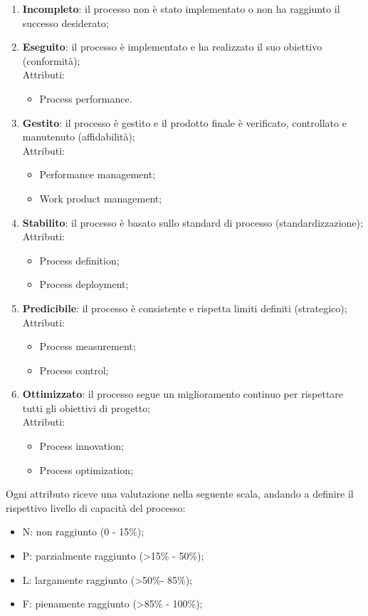 \begin{enumerate}
	\item \textbf{Incompleto}: il processo non è stato implementato o non ha raggiunto il successo desiderato;
	\item \textbf{Eseguito}: il processo è implementato e ha realizzato il suo obiettivo (conformità);\\
	Attributi:
	\begin{itemize}
		\item Process performance.
	\end{itemize}
	\item \textbf{Gestito}: il processo è gestito e il prodotto finale è verificato, controllato e manutenuto (affidabilità);\\
	Attributi:
	\begin{itemize}
		\item  Performance management;
		\item  Work product management;
	\end{itemize}
	\item \textbf{Stabilito}: il processo è basato sullo standard di processo (standardizzazione);\\
	Attributi:
	\begin{itemize}
		\item  Process definition;
		\item  Process deployment;
	\end{itemize}
	\item \textbf{Predicibile}: il processo è consistente e rispetta limiti definiti (strategico);\\
	Attributi:
	\begin{itemize}
		\item  Process measurement;
		\item  Process control;
	\end{itemize}
	\item \textbf{Ottimizzato}: il processo segue un miglioramento continuo per rispettare tutti gli obiettivi di
progetto;\\
Attributi:
	\begin{itemize}
		\item  Process innovation;
		\item  Process optimization;
	\end{itemize}
\end{enumerate}

Ogni attributo riceve una valutazione nella seguente scala, andando a definire il rispettivo livello di
capacità del processo:
\begin{itemize}
	\item N: non raggiunto (0 - 15\%);
	\item P: parzialmente raggiunto (>15\% - 50\%);
	\item L: largamente raggiunto (>50\%- 85\%);
	\item F: pienamente raggiunto (>85\% - 100\%);
\end{itemize}

